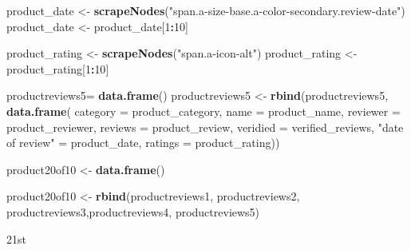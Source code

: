 \documentclass[
]{article}
\newenvironment{Shaded}{\begin{snugshade}}{\end{snugshade}}
\newcommand{\AttributeTok}[1]{\textcolor[rgb]{0.13,0.29,0.53}{#1}}
\newcommand{\DecValTok}[1]{\textcolor[rgb]{0.00,0.00,0.81}{#1}}
\newcommand{\FunctionTok}[1]{\textcolor[rgb]{0.13,0.29,0.53}{\textbf{#1}}}
\newcommand{\NormalTok}[1]{#1}
\newcommand{\OtherTok}[1]{\textcolor[rgb]{0.56,0.35,0.01}{#1}}
\newcommand{\SpecialCharTok}[1]{\textcolor[rgb]{0.81,0.36,0.00}{\textbf{#1}}}
\newcommand{\StringTok}[1]{\textcolor[rgb]{0.31,0.60,0.02}{#1}}
\begin{document}
\begin{Shaded}
\begin{Highlighting}[]
\NormalTok{  product\_date }\OtherTok{\textless{}{-}} \FunctionTok{scrapeNodes}\NormalTok{(}\StringTok{"span.a{-}size{-}base.a{-}color{-}secondary.review{-}date"}\NormalTok{)}
\NormalTok{  product\_date }\OtherTok{\textless{}{-}}\NormalTok{ product\_date[}\DecValTok{1}\SpecialCharTok{:}\DecValTok{10}\NormalTok{]}
  
\NormalTok{  product\_rating }\OtherTok{\textless{}{-}} \FunctionTok{scrapeNodes}\NormalTok{(}\StringTok{"span.a{-}icon{-}alt"}\NormalTok{)}
\NormalTok{  product\_rating }\OtherTok{\textless{}{-}}\NormalTok{ product\_rating[}\DecValTok{1}\SpecialCharTok{:}\DecValTok{10}\NormalTok{]}
  
\NormalTok{  productreviews5}\OtherTok{=} \FunctionTok{data.frame}\NormalTok{()}
\NormalTok{  productreviews5 }\OtherTok{\textless{}{-}} \FunctionTok{rbind}\NormalTok{(productreviews5, }\FunctionTok{data.frame}\NormalTok{(}
                      \AttributeTok{category =}\NormalTok{ product\_category,}
                      \AttributeTok{name =}\NormalTok{ product\_name,}
                      \AttributeTok{reviewer =}\NormalTok{ product\_reviewer,}
                      \AttributeTok{reviews =}\NormalTok{ product\_review,}
                      \AttributeTok{veridied =}\NormalTok{ verified\_reviews,}
                      \StringTok{"date of review"} \OtherTok{=}\NormalTok{ product\_date,}
                      \AttributeTok{ratings =}\NormalTok{ product\_rating))}
  
\NormalTok{  product20of10 }\OtherTok{\textless{}{-}} \FunctionTok{data.frame}\NormalTok{()}
  
\NormalTok{  product20of10 }\OtherTok{\textless{}{-}} \FunctionTok{rbind}\NormalTok{(productreviews1, productreviews2, productreviews3,productreviews4, productreviews5)}
\end{Highlighting}
\end{Shaded}

21st
\end{document}
